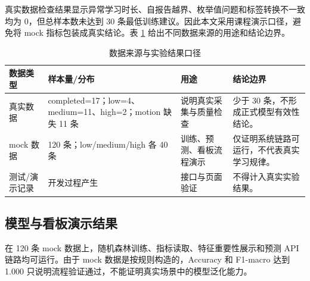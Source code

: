 \documentclass[UTF8,a4paper,fontset=fandol]{ctexart}
\begin{document}
真实数据检查结果显示异常学习时长、自报告越界、枚举值问题和标签转换不一致均为 0，但总样本数未达到 30 条最低训练建议。因此本文采用课程演示口径，避免将 mock 指标包装成真实结论。表 \ref{tab:data} 给出不同数据来源的用途和结论边界。

\begin{table}[htbp]
  \centering
  \caption{数据来源与实验结果口径}
  \label{tab:data}
  \small
  \begin{tabularx}{0.95\textwidth}{p{2.1cm}p{4.0cm}p{3.4cm}X}
    \toprule
    数据类型 & 样本量/分布 & 用途 & 结论边界 \\
    \midrule
    真实数据 & completed=17；low=4、medium=11、high=2；motion 缺失 11 条 & 说明真实采集与质量检查 & 少于 30 条，不形成正式模型有效性结论。 \\
    mock 数据 & 120 条；low/medium/high 各 40 条 & 训练、预测、看板流程演示 & 仅证明系统链路可运行，不代表真实学习规律。 \\
    测试/演示记录 & 开发过程产生 & 接口与页面验证 & 不得计入真实实验结果。 \\
    \bottomrule
  \end{tabularx}
\end{table}

\subsection{模型与看板演示结果}

在 120 条 mock 数据上，随机森林训练、指标读取、特征重要性展示和预测 API 链路均可运行。由于 mock 数据是按规则构造的，Accuracy 和 F1-macro 达到 1.000 只说明流程验证通过，不能证明真实场景中的模型泛化能力。
\end{document}
